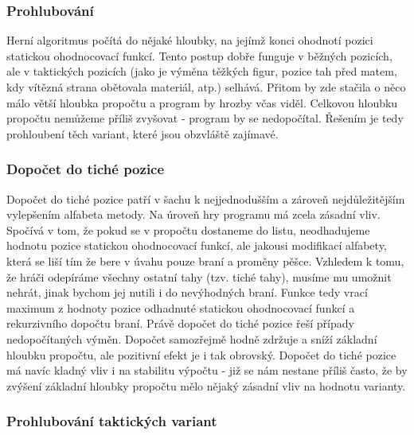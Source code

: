 \documentclass[11pt, titlepage]{article}
\begin{document}
\subsubsection{Prohlubování}

Herní algoritmus počítá do nějaké hloubky, na jejímž konci ohodnotí pozici statickou ohodnocovací funkcí. Tento postup dobře funguje v běžných pozicích, ale v taktických pozicích (jako je výměna těžkých figur, pozice tah před matem, kdy vítězná strana obětovala materiál, atp.) selhává. Přitom by zde stačila o něco málo větší hloubka propočtu a program by hrozby včas viděl. Celkovou hloubku propočtu nemůžeme příliš zvyšovat - program by se nedopočítal. Řešením je tedy prohloubení těch variant, které jsou obzvláště zajímavé.

\subsubsection{Dopočet do tiché pozice}

Dopočet do tiché pozice patří v šachu k nejjednodušším a zároveň nejdůležitějším vylepšením alfabeta metody. Na úroveň hry programu má zcela zásadní vliv. Spočívá v tom, že pokud se v propočtu dostaneme do listu, neodhadujeme hodnotu pozice statickou ohodnocovací funkcí, ale jakousi modifikací alfabety, která se liší tím že bere v úvahu pouze braní a proměny pěšce. Vzhledem k tomu, že hráči odepíráme všechny ostatní tahy (tzv. tiché tahy), musíme mu umožnit nehrát, jinak bychom jej nutili i do nevýhodných braní. Funkce tedy vrací maximum z hodnoty pozice odhadnuté statickou ohodnocovací funkcí a rekurzivního dopočtu braní. Právě dopočet do tiché pozice řeší případy nedopočítaných výměn. Dopočet samozřejmě hodně zdržuje a sníží základní hloubku propočtu, ale pozitivní efekt je i tak obrovský. Dopočet do tiché pozice má navíc kladný vliv i na stabilitu výpočtu - již se nám nestane příliš často, že by zvýšení základní hloubky propočtu mělo nějaký zásadní vliv na hodnotu varianty.

\subsubsection{Prohlubování taktických variant}
\end{document}
